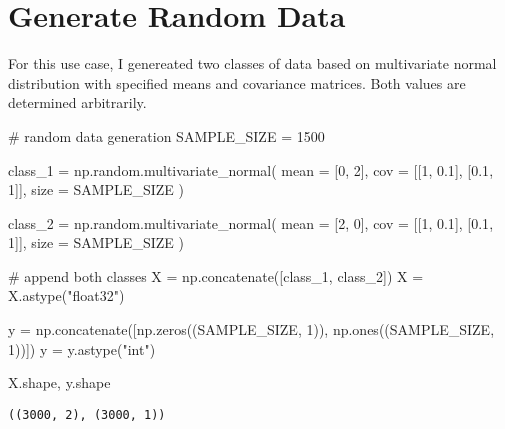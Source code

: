 \documentclass[
  letterpaper,
  DIV=11,
  numbers=noendperiod]{scrreprt}
\newenvironment{Shaded}{\begin{snugshade}}{\end{snugshade}}
\newcommand{\CommentTok}[1]{\textcolor[rgb]{0.37,0.37,0.37}{#1}}
\newcommand{\DecValTok}[1]{\textcolor[rgb]{0.68,0.00,0.00}{#1}}
\newcommand{\FloatTok}[1]{\textcolor[rgb]{0.68,0.00,0.00}{#1}}
\newcommand{\NormalTok}[1]{\textcolor[rgb]{0.00,0.23,0.31}{#1}}
\newcommand{\OperatorTok}[1]{\textcolor[rgb]{0.37,0.37,0.37}{#1}}
\newcommand{\StringTok}[1]{\textcolor[rgb]{0.13,0.47,0.30}{#1}}
\begin{document}
\hypertarget{generate-random-data-1}{%
\section{Generate Random Data}\label{generate-random-data-1}}

For this use case, I genereated two classes of data based on
multivariate normal distribution with specified means and covariance
matrices. Both values are determined arbitrarily.

\begin{Shaded}
\begin{Highlighting}[]
\CommentTok{\# random data generation}
\NormalTok{SAMPLE\_SIZE }\OperatorTok{=} \DecValTok{1500}

\NormalTok{class\_1 }\OperatorTok{=}\NormalTok{ np.random.multivariate\_normal(}
\NormalTok{    mean }\OperatorTok{=}\NormalTok{ [}\DecValTok{0}\NormalTok{, }\DecValTok{2}\NormalTok{],}
\NormalTok{    cov  }\OperatorTok{=}\NormalTok{ [[}\DecValTok{1}\NormalTok{, }\FloatTok{0.1}\NormalTok{], [}\FloatTok{0.1}\NormalTok{, }\DecValTok{1}\NormalTok{]],}
\NormalTok{    size }\OperatorTok{=}\NormalTok{ SAMPLE\_SIZE}
\NormalTok{)}

\NormalTok{class\_2 }\OperatorTok{=}\NormalTok{ np.random.multivariate\_normal(}
\NormalTok{    mean }\OperatorTok{=}\NormalTok{ [}\DecValTok{2}\NormalTok{, }\DecValTok{0}\NormalTok{],}
\NormalTok{    cov  }\OperatorTok{=}\NormalTok{ [[}\DecValTok{1}\NormalTok{, }\FloatTok{0.1}\NormalTok{], [}\FloatTok{0.1}\NormalTok{, }\DecValTok{1}\NormalTok{]],}
\NormalTok{    size }\OperatorTok{=}\NormalTok{ SAMPLE\_SIZE}
\NormalTok{)}

\CommentTok{\# append both classes}
\NormalTok{X }\OperatorTok{=}\NormalTok{ np.concatenate([class\_1, class\_2])}
\NormalTok{X }\OperatorTok{=}\NormalTok{ X.astype(}\StringTok{"float32"}\NormalTok{)}

\NormalTok{y }\OperatorTok{=}\NormalTok{ np.concatenate([np.zeros((SAMPLE\_SIZE, }\DecValTok{1}\NormalTok{)), np.ones((SAMPLE\_SIZE, }\DecValTok{1}\NormalTok{))])}
\NormalTok{y }\OperatorTok{=}\NormalTok{ y.astype(}\StringTok{"int"}\NormalTok{)}

\NormalTok{X.shape, y.shape}
\end{Highlighting}
\end{Shaded}

\begin{verbatim}
((3000, 2), (3000, 1))
\end{verbatim}
\end{document}
